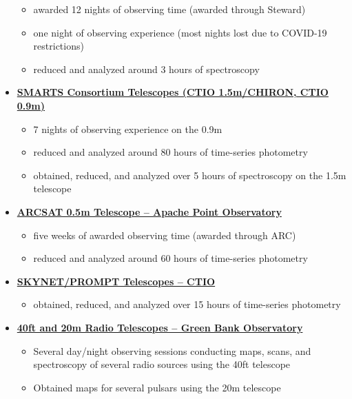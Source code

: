 \documentclass[letterpaper,12pt]{article}
\begin{document}
\begin{itemize}
\begin{itemize}
    \item awarded 12 nights of observing time (awarded through Steward)\vspace{-1mm}
    \item one night of observing experience (most nights lost due to COVID-19 restrictions)\vspace{-1mm}
    \item reduced and analyzed around 3 hours of spectroscopy
\end{itemize}
\item \href{http://www.ctio.noao.edu/noao/node/10}{\textbf{SMARTS Consortium Telescopes (CTIO 1.5m/CHIRON, CTIO 0.9m)}}
\begin{itemize}\vspace{-3mm}
    \item 7 nights of observing experience on the 0.9m\vspace{-1mm}
    \item reduced and analyzed around 80 hours of time-series photometry\vspace{-1mm}
    \item obtained, reduced, and analyzed over 5 hours of spectroscopy on the 1.5m telescope
\end{itemize}
\item \href{https://www.apo.nmsu.edu/Telescopes/ARCSAT/index.html}{\textbf{ARCSAT 0.5m Telescope -- Apache Point Observatory}}
\begin{itemize}\vspace{-3mm}
    \item five weeks of awarded observing time (awarded through ARC)\vspace{-1mm}
    \item reduced and analyzed around 60 hours of time-series photometry 
\end{itemize}
\item \href{https://skynet.unc.edu/}{\textbf{SKYNET/PROMPT Telescopes -- CTIO}}
\begin{itemize}\vspace{-3mm}
    \item obtained, reduced, and analyzed over 15 hours of time-series photometry
\end{itemize}
\item \href{https://greenbankobservatory.org/science/telescopes/}{\textbf{40ft and 20m Radio Telescopes -- Green Bank Observatory}}
\begin{itemize}\vspace{-3mm}
    \item Several day/night observing sessions conducting maps, scans, and spectroscopy of several radio sources using the 40ft telescope\vspace{-1mm}
    \item Obtained maps for several pulsars using the 20m telescope
\end{itemize}
\end{itemize}
\end{document}
